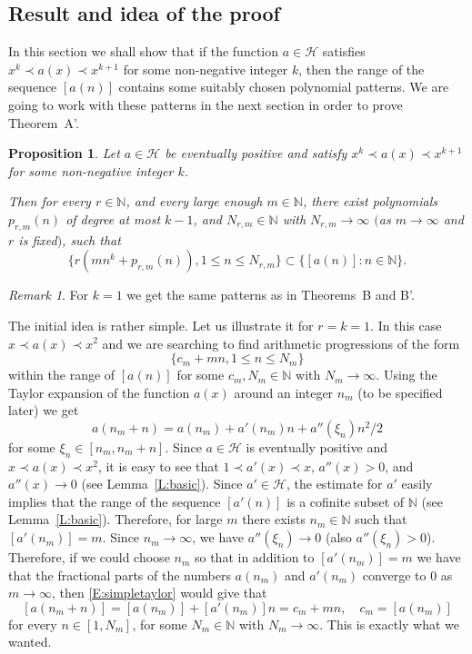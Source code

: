 \documentclass[11pt]{amsart}
\renewcommand{\H}{\mathcal{H}}
\newcommand{\N}{\mathbb{N}}
\theoremstyle{plain}
\newtheorem{proposition}[theorem]{Proposition}
\theoremstyle{definition}
\theoremstyle{remark}
\newtheorem*{remark}{Remark}
\begin{document}
\subsection{Result and idea of the proof} In this section we shall show
that if the function $a\in\H$ satisfies $x^k\prec a(x) \prec x^{k+1}$
for some non-negative integer $k$, then the range of the sequence
$[a(n)]$ contains some suitably chosen polynomial patterns. We are going to
work with these patterns in the next section in order to prove
Theorem~A'.
\begin{proposition}\label{P:polypattern} Let $a\in \H$ be eventually
  positive and satisfy $x^{k}\prec a(x)\prec x^{k+1}$ for some non-negative
  integer $k$.

  Then for every $r\in \N$, and every large enough $m\in\N$,
  there exist polynomials
  $p_{r,m}(n)$ of degree at most $k-1$, and $N_{r,m}\in\N$ with
  $N_{r,m}\to\infty$ $($as $m\to\infty$ and $r$ is fixed$)$, such that
$$
\{r(mn^k+p_{r,m}(n)), 1\leq n\leq N_{r,m}\} \subset \{[a(n)]\colon
n\in \N\}.
$$
\end{proposition}
\begin{remark}For $k=1$ we get the same patterns as in Theorems~B
  and B'.
\end{remark}
The initial idea is rather simple. Let us illustrate it for $r=k=1$. In this case
$x\prec a(x)\prec x^2$ and
 we are searching to find arithmetic progressions of the form
 $$
 \{c_m+mn, 1\leq n\leq N_m\}
$$
within the range of $[a(n)]$ for some $c_m,N_m\in\N$ with
$N_m\to\infty$.  Using the Taylor expansion of the function $a(x)$ around an integer
$n_m$ (to be specified later) we get
\begin{equation}\label{E:simpletaylor}
  a(n_m+n)=a(n_m)+a'(n_m)n+a''(\xi_n)n^2/2
\end{equation}
for some $\xi_n\in [n_m,n_m+n]$. Since $a\in \H$ is eventually positive and $x\prec a(x)\prec
x^2$, it is easy to see that $1\prec a'(x)\prec x$, $a''(x)>0$, and
$a''(x)\to 0$ (see Lemma~\ref{L:basic}).  Since $a'\in\H$, the
estimate for $a'$ easily implies that the range of the sequence
$[a'(n)]$ is a cofinite subset of $\N$ (see Lemma~\ref{L:basic}).  Therefore,
for large $m$ there exists $n_m\in \N$ such that $[a'(n_m)]=m$. Since
$n_m\to \infty$, we have  $a''(\xi_n)\to 0$
(also $a''(\xi_n)>0$). Therefore, if we could choose $n_m$ so that in addition
to $[a'(n_m)]=m$ we have that the fractional parts of the numbers
$a(n_m)$ and $a'(n_m)$ converge to $0$ as $m\to\infty$, then
\eqref{E:simpletaylor} would give that
$$
[a(n_m+n)]=[a(n_m)]+[a'(n_m)]n=c_m+mn, \quad c_m=[a(n_m)]
$$
for every $n\in [1,N_m]$, for some $N_m\in\N$ with $N_m\to\infty$. This
is exactly what we wanted.
\end{document}
